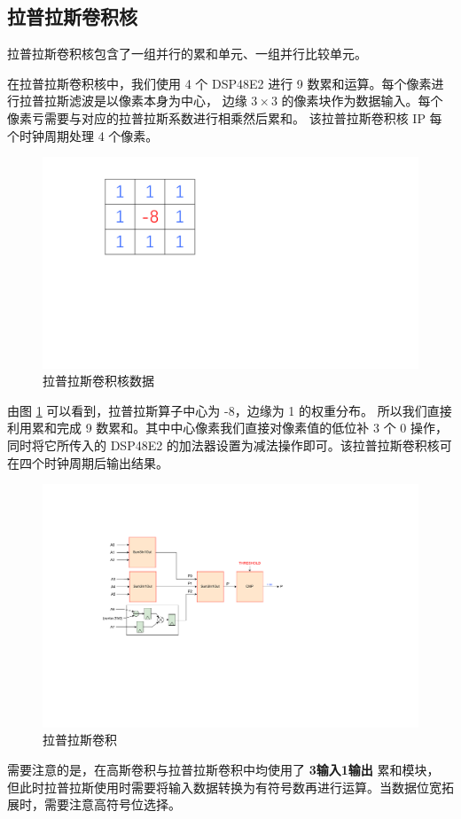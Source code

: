 \documentclass[12pt, a4paper, oneside]{ctexbook}
\begin{document}
	\subsection{拉普拉斯卷积核}
	拉普拉斯卷积核包含了一组并行的累和单元、一组并行比较单元。\par
	在拉普拉斯卷积核中，我们使用 4 个 DSP48E2 进行 9 数累和运算。每个像素进行拉普拉斯滤波是以像素本身为中心，
	边缘 $3\times3$ 的像素块作为数据输入。每个像素亏需要与对应的拉普拉斯系数进行相乘然后累和。
	该拉普拉斯卷积核 IP 每个时钟周期处理 4 个像素。\par
	\begin{figure}[h]
		\centering
		\includegraphics[scale=0.4]{pic/number_3}
		\caption{拉普拉斯卷积核数据}
		\label{fig:number3}
	\end{figure}
	由图 \ref{fig:number3} 可以看到，拉普拉斯算子中心为 -8，边缘为 1 的权重分布。
	所以我们直接利用累和完成 9 数累和。其中中心像素我们直接对像素值的低位补 3 个 0 操作，
	同时将它所传入的 DSP48E2 的加法器设置为减法操作即可。该拉普拉斯卷积核可在四个时钟周期后输出结果。\par
	\begin{figure}[h]	
		\centering
		\includegraphics[scale=0.7]{pic/laplace.pdf}
		\caption{拉普拉斯卷积}
		\label{laplace}
	\end{figure}	
	需要注意的是，在高斯卷积与拉普拉斯卷积中均使用了 \textbf{3输入1输出} 累和模块，
	但此时拉普拉斯使用时需要将输入数据转换为有符号数再进行运算。当数据位宽拓展时，需要注意高符号位选择。
	
\end{document}
